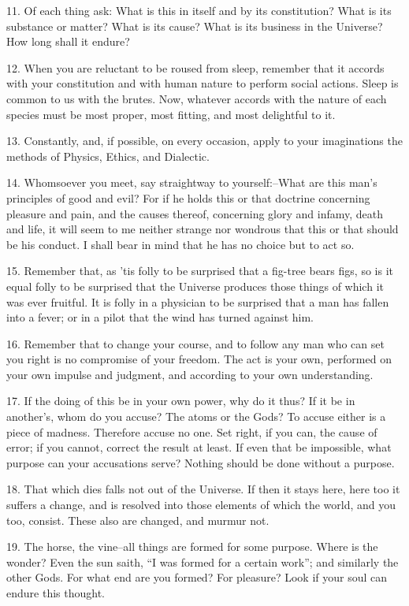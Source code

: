 \documentclass{book}
\begin{document}
11. Of each thing ask: What is this in itself and by its constitution?
What is its substance or matter? What is its cause? What is its
business in the Universe? How long shall it endure?

\newpage

12. When you are reluctant to be roused from sleep, remember that it
accords with your constitution and with human nature to perform social
actions. Sleep is common to us with the brutes. Now, whatever accords
with the nature of each species must be most proper, most fitting, and
most delightful to it.

13. Constantly, and, if possible, on every occasion, apply to your
imaginations the methods of Physics, Ethics, and Dialectic.

14. Whomsoever you meet, say straightway to yourself:--What are this
man's principles of good and evil? For if he holds this or that
doctrine concerning pleasure and pain, and the causes thereof,
concerning glory and infamy, death and life, it will seem to me
neither strange nor wondrous that this or that should be his
conduct. I shall bear in mind that he has no choice but to act so.

15. Remember that, as 'tis folly to be surprised that a fig-tree bears
figs, so is it equal folly to be surprised that the Universe produces
those things of which it was ever fruitful. It is folly in a physician
to be surprised that a man has fallen into a fever; or in a pilot that
the wind has turned against him.

16. Remember that to change your course, and to follow any man who can
set you right is no compromise of your freedom. The act is your own,
performed on your own impulse and judgment, and according to your own
understanding.

17. If the doing of this be in your own power, why do it thus? If it
be in another's, whom do you accuse? The atoms or the Gods? To accuse
either is a piece of madness. Therefore accuse no one. Set right, if
you can, the cause of error; if you cannot, correct the result at
least. If even that be impossible, what purpose can your accusations
serve?  Nothing should be done without a purpose.

18. That which dies falls not out of the Universe. If then it stays
here, here too it suffers a change, and is resolved into those
elements of which the world, and you too, consist. These also are
changed, and murmur not.

19. The horse, the vine--all things are formed for some purpose. Where
is the wonder? Even the sun saith, ``I was formed for a certain work'';
and similarly the other Gods. For what end are you formed? For
pleasure?  Look if your soul can endure this thought.
\end{document}
